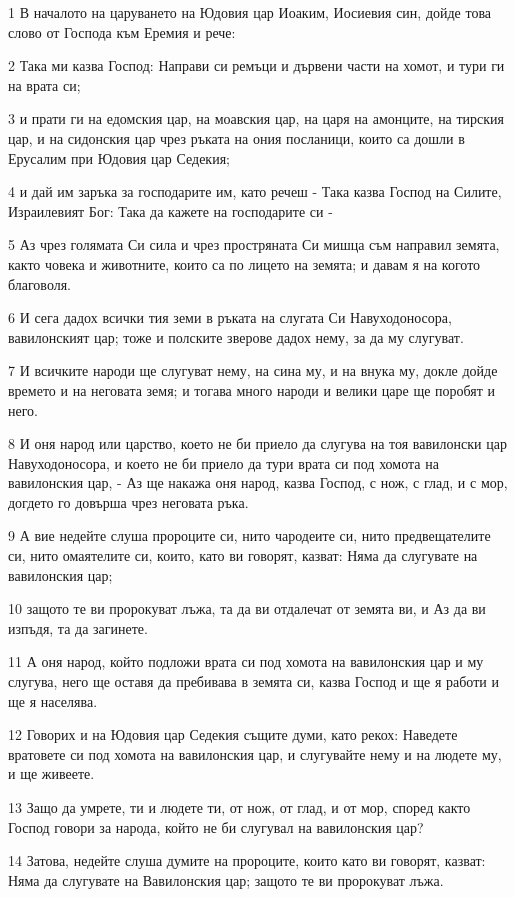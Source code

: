\par 1 В началото на царуването на Юдовия цар Иоаким, Иосиевия син, дойде това слово от Господа към Еремия и рече:
\par 2 Така ми казва Господ: Направи си ремъци и дървени части на хомот, и тури ги на врата си;
\par 3 и прати ги на едомския цар, на моавския цар, на царя на амонците, на тирския цар, и на сидонския цар чрез ръката на ония посланици, които са дошли в Ерусалим при Юдовия цар Седекия;
\par 4 и дай им заръка за господарите им, като речеш - Така казва Господ на Силите, Израилевият Бог: Така да кажете на господарите си -
\par 5 Аз чрез голямата Си сила и чрез простряната Си мишца съм направил земята, както човека и животните, които са по лицето на земята; и давам я на когото благоволя.
\par 6 И сега дадох всички тия земи в ръката на слугата Си Навуходоносора, вавилонският цар; тоже и полските зверове дадох нему, за да му слугуват.
\par 7 И всичките народи ще слугуват нему, на сина му, и на внука му, докле дойде времето и на неговата земя; и тогава много народи и велики царе ще поробят и него.
\par 8 И оня народ или царство, което не би приело да слугува на тоя вавилонски цар Навуходоносора, и което не би приело да тури врата си под хомота на вавилонския цар, - Аз ще накажа оня народ, казва Господ, с нож, с глад, и с мор, догдето го довърша чрез неговата ръка.
\par 9 А вие недейте слуша пророците си, нито чародеите си, нито предвещателите си, нито омаятелите си, които, като ви говорят, казват: Няма да слугувате на вавилонския цар;
\par 10 защото те ви пророкуват лъжа, та да ви отдалечат от земята ви, и Аз да ви изпъдя, та да загинете.
\par 11 А оня народ, който подложи врата си под хомота на вавилонския цар и му слугува, него ще оставя да пребивава в земята си, казва Господ и ще я работи и ще я населява.
\par 12 Говорих и на Юдовия цар Седекия същите думи, като рекох: Наведете вратовете си под хомота на вавилонския цар, и слугувайте нему и на людете му, и ще живеете.
\par 13 Защо да умрете, ти и людете ти, от нож, от глад, и от мор, според както Господ говори за народа, който не би слугувал на вавилонския цар?
\par 14 Затова, недейте слуша думите на пророците, които като ви говорят, казват: Няма да слугувате на Вавилонския цар; защото те ви пророкуват лъжа.
